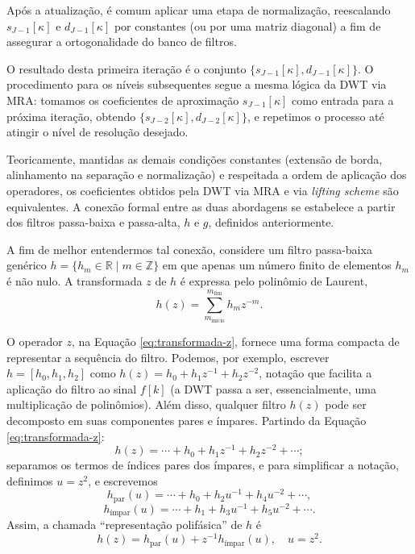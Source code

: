 Após a atualização, é comum aplicar uma etapa de normalização, reescalando \(s_{J-1}[\kappa]\) e \(d_{J-1}[\kappa]\) por constantes (ou por uma matriz diagonal) a fim de assegurar a ortogonalidade do banco de filtros.

O resultado desta primeira iteração é o conjunto \(\{s_{J-1}[\kappa], d_{J-1}[\kappa]\}\). 
O procedimento para os níveis subsequentes segue a mesma lógica da DWT via MRA: tomamos os coeficientes de aproximação \(s_{J-1}[\kappa]\) como entrada para a próxima iteração, obtendo \(\{s_{J-2}[\kappa], d_{J-2}[\kappa]\}\), e repetimos o processo até atingir o nível de resolução desejado.

Teoricamente, mantidas as demais condições constantes (extensão de borda, alinhamento na separação e normalização) e respeitada a ordem de aplicação dos operadores, os coeficientes obtidos pela DWT via MRA e via \emph{lifting scheme} são equivalentes. 
A conexão formal entre as duas abordagens se estabelece a partir dos filtros passa-baixa e passa-alta, \(h\) e \(g\), definidos anteriormente.

A fim de melhor entendermos tal conexão, considere um filtro passa-baixa genérico \(h = \{h_m \in \mathbb{R} \mid m \in \mathbb{Z}\}\) em que apenas um número finito de elementos \(h_m\) é não nulo. 
A transformada \(z\) de \(h\) é expressa pelo polinômio de Laurent, 
\begin{equation}
    h(z) = \sum\limits_{m_{\text{início}}}^{m_{\text{fim}}}h_m z^{-m}.
    \label{eq:transformada-z}
\end{equation}

O operador \(z\), na Equação \ref{eq:transformada-z}, fornece uma forma compacta de representar a sequência do filtro. 
Podemos, por exemplo, escrever \(h = [h_0, h_1, h_2]\) como \(h(z) = h_0 + h_1 z^{-1} + h_2 z^{-2}\), notação que facilita a aplicação do filtro ao sinal \(f[k]\) (a DWT passa a ser, essencialmente, uma multiplicação de polinômios). 
Além disso, qualquer filtro \(h(z)\) pode ser decomposto em suas componentes pares e ímpares. Partindo da Equação \ref{eq:transformada-z}:
\[
        h(z) = \cdots + h_0 + h_1 z^{-1} + h_2 z^{-2} + \cdots;
    \]
separamos os termos de índices pares dos ímpares, e para simplificar a notação, definimos \(u = z^{2}\), e escrevemos
	\[
        h_\text{par}(u) = \cdots + h_0 + h_2 u^{-1} + h_4 u^{-2} + \cdots,
    \]
	\[
        h_\text{ímpar}(u) = \cdots + h_1 + h_3 u^{-1} + h_5 u^{-2} + \cdots.
    \]
Assim, a chamada ``representação polifásica'' de \(h\) é \cite{daubechies_factoring_1998}
\begin{equation}
    h(z) = h_\text{par}(u) + z^{-1}h_\text{ímpar}(u), \quad u=z^{2}.
    \label{eq:representação-polifásica}
\end{equation}

